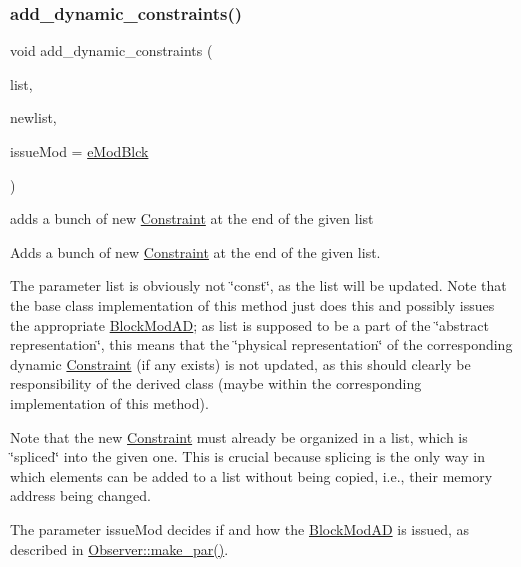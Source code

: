 \subsubsection{\texorpdfstring{add\+\_\+dynamic\+\_\+constraints()}{add\_dynamic\_constraints()}\hspace{0.1cm}{\footnotesize\ttfamily [1/2]}}
{\footnotesize\ttfamily void add\+\_\+dynamic\+\_\+constraints (\begin{DoxyParamCaption}\item[{std\+::list$<$ Const $>$ \&}]{list,  }\item[{std\+::list$<$ Const $>$ \&}]{newlist,  }\item[{\mbox{\hyperlink{group___modification___t_y_p_e_s_ga544246d8c462e9a2d817c2c30797968f}{c\+\_\+\+Mod\+Param}}}]{issue\+Mod = {\ttfamily \mbox{\hyperlink{group___modification___t_y_p_e_s_gga48fddcdd03a03f49b7e389ca1ed938d4a21b14b26b1c0093a0905f6fc010bad29}{e\+Mod\+Blck}}} }\end{DoxyParamCaption})}



adds a bunch of new \mbox{\hyperlink{class_s_m_spp__di__unipi__it_1_1_constraint}{Constraint}} at the end of the given list 

Adds a bunch of new \mbox{\hyperlink{class_s_m_spp__di__unipi__it_1_1_constraint}{Constraint}} at the end of the given list.

The parameter list is obviously not \char`\"{}const\char`\"{}, as the list will be updated. Note that the base class implementation of this method just does this and possibly issues the appropriate \mbox{\hyperlink{class_s_m_spp__di__unipi__it_1_1_block_mod_a_d}{Block\+Mod\+AD}}; as list is supposed to be a part of the \char`\"{}abstract representation\char`\"{}, this means that the \char`\"{}physical
representation\char`\"{} of the corresponding dynamic \mbox{\hyperlink{class_s_m_spp__di__unipi__it_1_1_constraint}{Constraint}} (if any exists) is not updated, as this should clearly be responsibility of the derived class (maybe within the corresponding implementation of this method).

Note that the new \mbox{\hyperlink{class_s_m_spp__di__unipi__it_1_1_constraint}{Constraint}} must already be organized in a list, which is \char`\"{}spliced\char`\"{} into the given one. This is crucial because splicing is the only way in which elements can be added to a list without being copied, i.\+e., their memory address being changed.

The parameter issue\+Mod decides if and how the \mbox{\hyperlink{class_s_m_spp__di__unipi__it_1_1_block_mod_a_d}{Block\+Mod\+AD}} is issued, as described in \mbox{\hyperlink{class_s_m_spp__di__unipi__it_1_1_observer_a2d499ae38e5e95cf66cd71da32b0694a}{Observer\+::make\+\_\+par()}}. \mbox{\label{class_s_m_spp__di__unipi__it_1_1_block_a3fabbed976e93330b7f4af1bfb467670}} 
